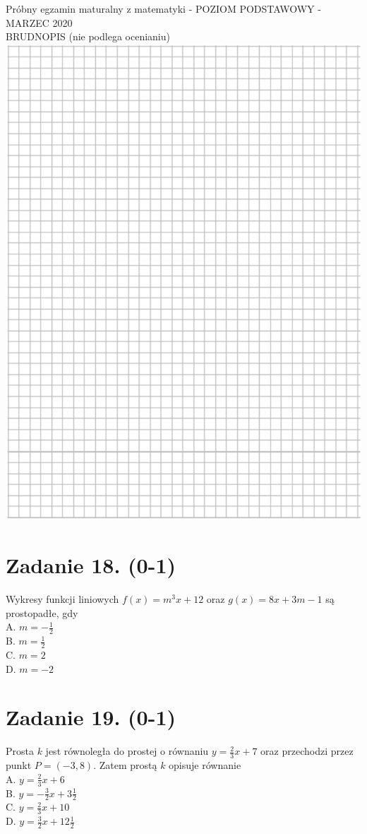 \documentclass[10pt]{article}
\begin{document}
Próbny egzamin maturalny z matematyki - POZIOM PODSTAWOWY - MARZEC 2020\\
BRUDNOPIS (nie podlega ocenianiu)\\
\includegraphics[max width=\textwidth, center]{2024_11_21_ba65d61981011633d840g-07}

\section*{Zadanie 18. (0-1)}
Wykresy funkcji liniowych \(f(x)=m^{3} x+12\) oraz \(g(x)=8 x+3 m-1\) są prostopadłe, gdy\\
A. \(m=-\frac{1}{2}\)\\
B. \(m=\frac{1}{2}\)\\
C. \(m=2\)\\
D. \(m=-2\)

\section*{Zadanie 19. (0-1)}
Prosta \(k\) jest równoległa do prostej o równaniu \(y=\frac{2}{3} x+7\) oraz przechodzi przez punkt \(P=(-3,8)\). Zatem prostą \(k\) opisuje równanie\\
A. \(y=\frac{2}{3} x+6\)\\
B. \(y=-\frac{3}{2} x+3 \frac{1}{2}\)\\
C. \(y=\frac{2}{3} x+10\)\\
D. \(y=\frac{3}{2} x+12 \frac{1}{2}\)
\end{document}
